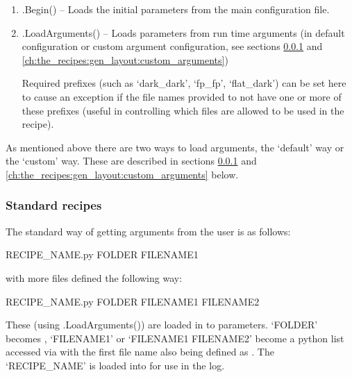 \begin{enumerate}
	\item \spirouStartup.Begin() -- Loads the initial parameters from the main configuration file.

	\item \spirouStartup.LoadArguments() -- Loads parameters from run time arguments (in default configuration or custom argument configuration, see sections \ref{ch:the_recipes:gen_layout:standard_recipes} and \ref{ch:the_recipes:gen_layout:custom_arguments})
	\begin{note}
	Required prefixes (such as `dark\_dark', `fp\_fp', `flat\_dark') can be set here to cause an exception if the file names provided to not have one or more of these prefixes (useful in controlling which files are allowed to be used in the recipe).
	\end{note}
\end{enumerate}

As mentioned above there are two ways to load arguments, the `default' way or the `custom' way. These are described in sections \ref{ch:the_recipes:gen_layout:standard_recipes} and \ref{ch:the_recipes:gen_layout:custom_arguments} below.


\clearpage
\newpage
\subsubsection{Standard recipes}
\label{ch:the_recipes:gen_layout:standard_recipes}

The standard way of getting arguments from the user is as follows:

\begin{cmdbox}
RECIPE_NAME.py FOLDER FILENAME1
\end{cmdbox}

\noindent with more files defined the following way:

\begin{cmdbox}
RECIPE_NAME.py FOLDER FILENAME1 FILENAME2
\end{cmdbox}

These (using \spirouStartup.LoadArguments()) are loaded in to parameters. `FOLDER' becomes , `FILENAME1' or `FILENAME1 FILENAME2' become a python list accessed via  with the first file name also being defined as . The `RECIPE\_NAME' is loaded into  for use in the log.

